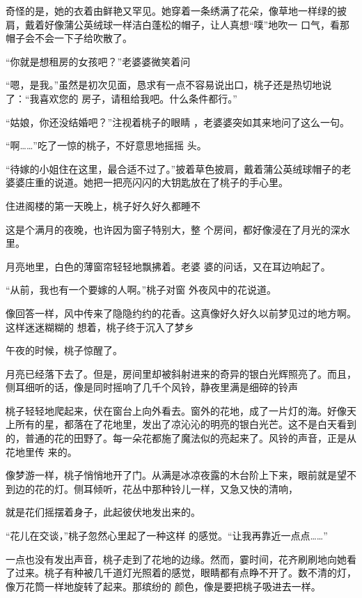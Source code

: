 \documentclass{article}
\begin{document}
奇怪的是，她的衣着由鲜艳又罕见。她穿着一条绣满了花朵，像草地一样绿的披肩，戴着好像蒲公英绒球一样洁白蓬松的帽子，让人真想“噗”地吹一
口气，看那帽子会不会一下子给吹散了。 

“你就是想租房的女孩吧？”老婆婆微笑着问

“嗯，是我。”虽然是初次见面，恳求有一点不容易说出口，桃子还是热切地说了：“我喜欢您的
房子，请租给我吧。什么条件都行。” 

\newpage

“姑娘，你还没结婚吧？”注视着桃子的眼睛
，老婆婆突如其来地问了这么一句。 

“啊……”吃了一惊的桃子，不好意思地摇摇
头。 

“待嫁的小姐住在这里，最合适不过了。”披着草色披肩，戴着蒲公英绒球帽子的老婆婆庄重的说道。她把一把亮闪闪的大钥匙放在了桃子的手心里。

住进阁楼的第一天晚上，桃子好久好久都睡不

这是个满月的夜晚，也许因为窗子特别大，整
个房间，都好像浸在了月光的深水里。 

月亮地里，白色的薄窗帘轻轻地飘拂着。老婆
婆的问话，又在耳边响起了。 

“从前，我也有一个要嫁的人啊。”桃子对窗
外夜风中的花说道。 

\newpage

像回答一样，风中传来了隐隐约约的花香。这真像好久好久以前梦见过的地方啊。这样迷迷糊糊的
想着，桃子终于沉入了梦乡 


午夜的时候，桃子惊醒了。 

月亮已经落下去了。但是，房间里却被斜射进来的奇异的银白光辉照亮了。而且，侧耳细听的话，像是同时摇响了几千个风铃，静夜里满是细碎的铃声

桃子轻轻地爬起来，伏在窗台上向外看去。窗外的花地，成了一片灯的海。好像天上所有的星，都落在了花地里，发出了凉沁沁的明亮的银白光芒。这不是白天看到的，普通的花的田野了。每一朵花都施了魔法似的亮起来了。风铃的声音，正是从花地里传
来的。 

像梦游一样，桃子悄悄地开了门。从满是冰凉夜露的木台阶上下来，眼前就是望不到边的花的灯。侧耳倾听，花丛中那种铃儿一样，又急又快的清响，

\newpage
就是花们摇摆着身子，此起彼伏地发出来的。 

“花儿在交谈，”桃子忽然心里起了一种这样
的感觉。“让我再靠近一点点……” 

一点也没有发出声音，桃子走到了花地的边缘。然而，霎时间，花齐刷刷地向她看了过来。桃子有种被几千道灯光照着的感觉，眼睛都有点睁不开了。数不清的灯，像万花筒一样地旋转了起来。那缤纷的
颜色，像是要把桃子吸进去一样。 
\end{document}
